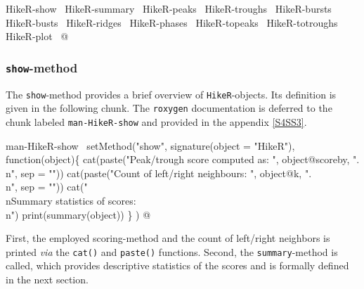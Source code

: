 \documentclass[a4paper]{article}
\begin{document}
\nwenddocs{}\endmoddef\let\nwnotused=\nwoutput{}
\LA{}HikeR-show~{\nwtagstyle{}}\RA{}
\LA{}HikeR-summary~{\nwtagstyle{}}\RA{}
\LA{}HikeR-peaks~{\nwtagstyle{}}\RA{}
\LA{}HikeR-troughs~{\nwtagstyle{}}\RA{}
\LA{}HikeR-bursts~{\nwtagstyle{}}\RA{}
\LA{}HikeR-busts~{\nwtagstyle{}}\RA{}
\LA{}HikeR-ridges~{\nwtagstyle{}}\RA{}
\LA{}HikeR-phases~{\nwtagstyle{}}\RA{}
\LA{}HikeR-topeaks~{\nwtagstyle{}}\RA{}
\LA{}HikeR-totroughs~{\nwtagstyle{}}\RA{}
\LA{}HikeR-plot~{\nwtagstyle{}}\RA{}
\nwnotused{HikerMethods.R}\nwendcode{}@

\subsubsection{\texttt{show}-method}
The \verb?show?-method provides a brief overview of
\verb?HikeR?-objects. Its definition is given in the following chunk. The
\verb?roxygen? documentation is deferred to the chunk labeled
\verb?man-HikeR-show? and provided in the appendix \ref{S4SS3}.

\nwenddocs{}\endmoddef
\LA{}man-HikeR-show~{\nwtagstyle{}}\RA{}
setMethod("show",
          signature(object = "HikeR"), function(object)\{
              cat(paste("Peak/trough score computed as: ",
                        object@scoreby, ".\\n", sep = ""))
              cat(paste("Count of left/right neighbours: ", object@k,
                        ".\\n", sep = ""))
              cat("\\nSummary statistics of scores:\\n")
              print(summary(object))
          \}
)
\nwendcode{}@

First, the employed scoring-method and the count of left/right
neighbors is printed \emph{via} the \verb?cat()? and \verb?paste()?
functions. Second, the \verb?summary?-method is called, which provides
descriptive statistics of the scores and is formally defined in the
next section.
\end{document}
